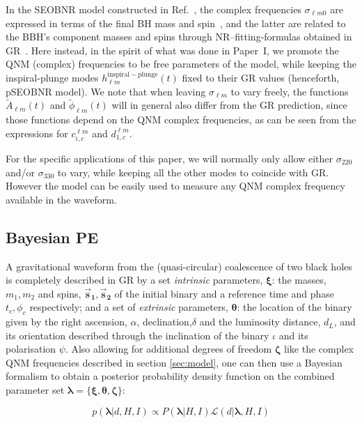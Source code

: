 \documentclass[twocolumn,prd,superscriptaddress,amsfonts,amssymb,amsmath,preprintnumbers]{revtex4-1}
\newcommand{\paperone}{Paper~I\xspace}
\newcommand{\blambda}{\bm{\lambda}}
\newcommand{\btheta}{\bm{\theta}}
\newcommand{\bxi}{\bm{\xi}}
\newcommand{\bzeta}{\bm{\zeta}}
\newcommand{\bs}[1]{\bm{\vec{s}_{#1}}}
\begin{document}
In the SEOBNR model constructed in Ref.~\cite{Cotesta:2018fcv}, the complex frequencies $\sigma_{\ell m 0}$  are expressed in terms of the final BH mass and spin~\cite{Berti:2005ys,Berti:2009kk}, and the latter are related to the BBH's component masses and spins through NR--fitting-formulas obtained in GR~\cite{Taracchini:2013rva,Hofmann:2016yih}. Here instead, in the spirit of what was done in \paperone, we promote the QNM (complex) frequencies to be free parameters of the model, while keeping the inspiral-plunge modes $h_{\ell m}^\mathrm{inspiral-plunge}(t)$ fixed to their GR values (henceforth, pSEOBNR model). 
We note that when leaving $\sigma_{\ell m}$ to vary freely, the functions $\tilde{A}_{\ell m}(t)$ and $\tilde{\phi}_{\ell m}(t)$ will in general also differ from the GR prediction, since those functions depend on the QNM complex frequencies, as can be seen from the expressions for $c_{i,c}^{\ell m}$ and $d_{1,c}^{\ell m}$.

For the specific applications of this paper, we will normally only allow either $\sigma_{220}$ and/or $\sigma_{330}$ to vary, while keeping all the other modes to coincide with GR. However the model can be easily used to measure any QNM complex frequency available in the waveform.



\subsection{Bayesian PE}\label{sec:method}

A gravitational waveform from the (quasi-circular) coalescence of two black holes is completely described in GR by a set \textit{intrinsic} parameters, $\bxi$: the masses, $m_1, m_2$ and spins, $\bs1, \bs2$ of the initial binary and a reference time and phase $t_c, \phi_c$ respectively; and a set of \textit{extrinsic} parameters, $\btheta$: the location of the binary given by the right ascension, $\alpha$, declination,$\delta$ and the luminosity distance, $d_L$, and its orientation described through the inclination of the binary $\iota$ and its polarisation $\psi$. Also allowing for additional degrees of freedom $\bzeta$ like the complex QNM frequencies described in section \ref{sec:model}, one can then use a Bayesian formalism to obtain a posterior probability density function on the combined parameter set $\blambda = \{\bxi, \btheta, \bzeta\}$:

\begin{equation}
p(\blambda | d, H, I) \propto P(\blambda | H,I) \mathcal{L}(d | \blambda, H, I)
\end{equation}
\end{document}
